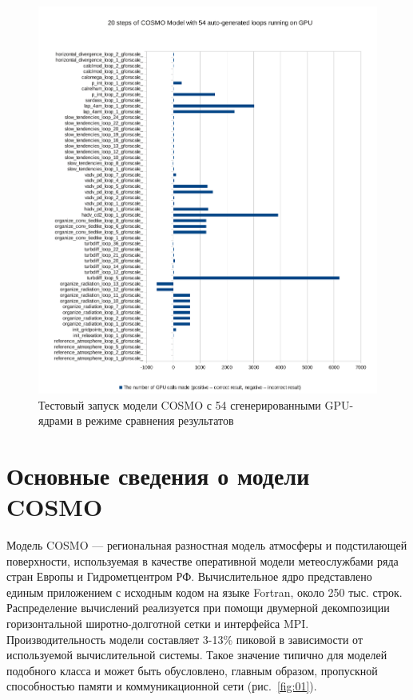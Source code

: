 \documentclass[a4,12pt]{report}
\begin{document}
\begin{figure}
\centering
\includegraphics[scale=0.7]{cosmo_20-54_test}
\caption{Тестовый запуск модели COSMO с 54 сгенерированными GPU-ядрами в режиме сравнения результатов}
\label{fig:compare}
\end{figure}

\chapter{Основные сведения о модели COSMO}

Модель COSMO --- региональная разностная модель атмосферы и подстилающей поверхности, используемая в качестве оперативной модели метеослужбами ряда стран Европы и Гидрометцентром РФ. Вычислительное ядро представлено единым приложением с исходным кодом на языке Fortran, около 250 тыс. строк. Распределение вычислений реализуется при помощи двумерной декомпозиции горизонтальной широтно-долготной сетки и интерфейса MPI. Производительность модели составляет 3-13\% пиковой в зависимости от используемой вычислительной системы. Такое значение типично для моделей подобного класса и может быть обусловлено, главным образом, пропускной способностью памяти и коммуникационной сети (рис.~\ref{fig:01}).
\end{document}
